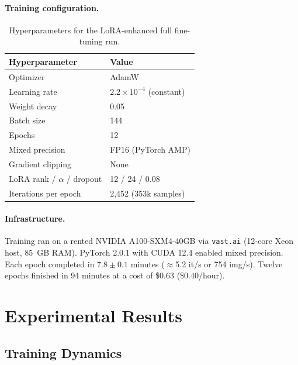 \documentclass[11pt]{article}
\begin{document}
\paragraph{Training configuration.}
\begin{table}[H]
\centering
\small
\begin{tabular}{ll}
\toprule
\textbf{Hyperparameter} & \textbf{Value} \\
\midrule
Optimizer & AdamW \\
Learning rate & $2.2 \times 10^{-4}$ (constant) \\
Weight decay & 0.05 \\
Batch size & 144 \\
Epochs & 12 \\
Mixed precision & FP16 (PyTorch AMP) \\
Gradient clipping & None \\
LoRA rank / $\alpha$ / dropout & 12 / 24 / 0.08 \\
Iterations per epoch & 2,452 (353k samples) \\
\bottomrule
\end{tabular}
\caption{Hyperparameters for the LoRA-enhanced full fine-tuning run.}
\label{tab:hyperparams}
\end{table}

\paragraph{Infrastructure.} Training ran on a rented NVIDIA A100-SXM4-40GB via \texttt{vast.ai} (12-core Xeon host, 85~GB RAM). PyTorch 2.0.1 with CUDA 12.4 enabled mixed precision. Each epoch completed in $7.8 \pm 0.1$ minutes ($\approx$5.2 it/s or 754 img/s). Twelve epochs finished in 94 minutes at a cost of \$0.63 (\$0.40/hour).

\section{Experimental Results}

\subsection{Training Dynamics}
\end{document}
